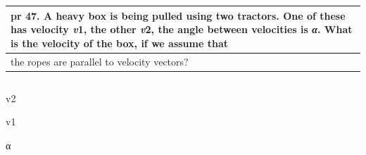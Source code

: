 \documentclass[
]{article}
\begin{document}
\begin{longtable}[]{@{}l@{}}
\toprule
\textbf{pr 47.} A heavy box is being pulled using two tractors. One of
these has velocity \emph{v}1, the other \emph{v}2, the angle between
velocities is \emph{α}. What is the velocity of the box, if we assume
that \\
\midrule
\endhead
the ropes are parallel to velocity vectors? \\
\bottomrule
\end{longtable}

\begin{longtable}[]{@{}l@{}}
\toprule
\endhead
 \\
\bottomrule
\end{longtable}

v2

v1

α
\end{document}
